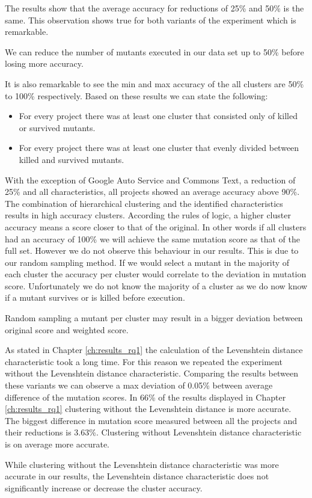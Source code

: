\documentclass[../main]{subfiles}
\begin{document}
The results show that the average accuracy for reductions of 25\% and 50\% is the same.
This observation shows true for both variants of the experiment which is remarkable.
\begin{finding}
    We can reduce the number of mutants executed in our data set up to 50\% before losing more accuracy.
\end{finding}
It is also remarkable to see the min and max accuracy of the all clusters are 50\% to 100\% respectively.
Based on these results we can state the following:
\begin{itemize}
    \item For every project there was at least one cluster that consisted only of killed or survived mutants.
    \item For every project there was at least one cluster that evenly divided between killed and survived mutants.
\end{itemize}
With the exception of Google Auto Service and Commons Text, a reduction of 25\% and all characteristics, all projects showed an average accuracy above 90\%.
The combination of hierarchical clustering and the identified characteristics results in high accuracy clusters.
\newline
According the rules of logic, a higher cluster accuracy means a score closer to that of the original.
In other words if all clusters had an accuracy of 100\% we will achieve the same mutation score as that of the full set.
However we do not observe this behaviour in our results.
This is due to our random sampling method.
If we would select a mutant in the majority of each cluster the accuracy per cluster would correlate to the deviation in mutation score.
Unfortunately we do not know the majority of a cluster as we do now know if a mutant survives or is killed before execution.
\begin{finding}
    Random sampling a mutant per cluster may result in a bigger deviation between original score and weighted score.
\end{finding}
As stated in Chapter \ref{ch:results_rq1} the calculation of the Levenshtein distance characteristic took a long time.
For this reason we repeated the experiment without the Levenshtein distance characteristic.
Comparing the results between these variants we can observe a max deviation of 0.05\% between average difference of the mutation scores.
In 66\% of the results displayed in Chapter \ref{ch:results_rq1} clustering without the Levenshtein distance is more accurate.
The biggest difference in mutation score measured between all the projects and their reductions is 3.63\%.
Clustering without Levenshtein distance characteristic is on average more accurate.
\begin{finding}
    While clustering without the Levenshtein distance characteristic was more accurate in our results, the Levenshtein distance characteristic does not significantly increase or decrease the cluster accuracy.
\end{finding}
\end{document}
